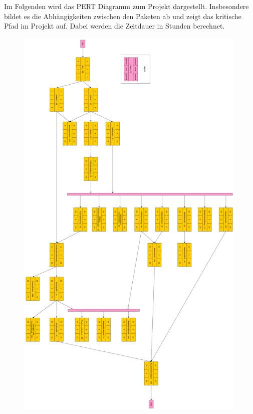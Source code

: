 \documentclass{article}
\begin{document}
Im Folgenden wird das PERT Diagramm zum Projekt dargestellt. Insbesondere bildet es die Abhängigkeiten zwischen den Paketen ab und zeigt das kritische Pfad im Projekt auf. Dabei werden die Zeitdauer in Stunden berechnet.

\begin{figure}[H]
	\centering
	\includegraphics[width = 30em]{PERT}
\end{figure}

\end{document}
